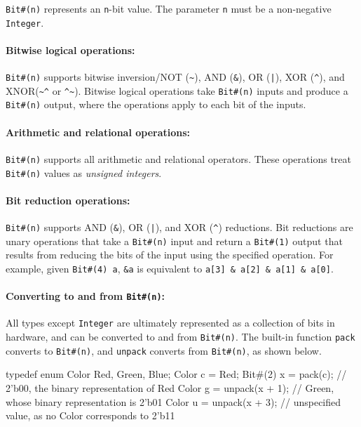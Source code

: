 \verb|Bit#(n)| represents an \verb|n|-bit value.
The parameter \verb|n| must be a non-negative \verb|Integer|.

\paragraph{Bitwise logical operations:}
\verb|Bit#(n)| supports bitwise inversion/NOT (\verb|~|), AND (\verb|&|), OR (\texttt{|}), XOR (\verb|^|), and XNOR(\verb|~^| or \verb|^~|).
Bitwise logical operations take \verb|Bit#(n)| inputs and produce a \verb|Bit#(n)| output, where the operations apply to each bit of the inputs.

\paragraph{Arithmetic and relational operations:}
\verb|Bit#(n)| supports all arithmetic and relational operators.
These operations treat \verb|Bit#(n)| values as \emph{unsigned integers}.

\paragraph{Bit reduction operations:}
\verb|Bit#(n)| supports AND (\verb|&|), OR (\texttt{|}), and XOR (\verb|^|) reductions.
Bit reductions are unary operations that take a \verb|Bit#(n)| input
and return a \verb|Bit#(1)| output that results
from reducing the bits of the input using the specified operation.
For example, given \verb|Bit#(4) a|, \verb|&a| is equivalent to \verb|a[3] & a[2] & a[1] & a[0]|.

\paragraph{Converting to and from \texttt{Bit\#(n)}:}
All types except \texttt{Integer} are ultimately represented as a collection of bits in hardware, and can be converted to and from \texttt{Bit\#(n)}.
The built-in function \verb|pack| converts to \verb|Bit#(n)|,
and \verb|unpack| converts from \verb|Bit#(n)|, as shown below.

\begin{mscode}
typedef enum Color {Red, Green, Blue};
Color c = Red;
Bit#(2) x = pack(c);      // 2'b00, the binary representation of Red
Color g = unpack(x + 1);  // Green, whose binary representation is 2'b01
Color u = unpack(x + 3);  // unspecified value, as no Color corresponds to 2'b11
\end{mscode}

